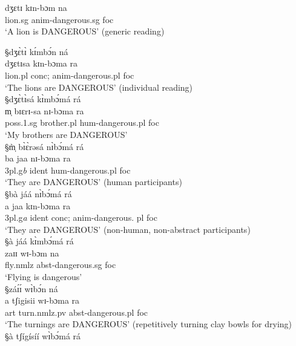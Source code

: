 \begin{exe}
  \ex\label{ex:agr1}
\begin{xlist}


\ex\label{ex:agrA}

\gll 
     {dʒɛtɪ} {kɪn}-{bɔm} {na} \\
	{lion.{\sc sg}} {\sc anim}-{dangerous.{\sc sg}} {\sc foc} \\
\glt  `A lion is DANGEROUS' (generic reading) 

 {\S dʒɛ̀tɪ̀ kɪ́mbɔ́n  ná}\\

\ex\label{ex:agrB}
\gll
      {dʒɛtɪsa} {kɪn}-{bɔma} {ra} \\
	{lion.{\sc pl}}  {\sc  conc; anim}-{dangerous.{\sc pl}} {\sc foc} \\
\glt  `The lions are DANGEROUS' (individual reading) \\
 {\S  dʒɛ̀tɪ̀sá kɪ̀mbɔ́má  rá} \\


\ex\label{ex:agrD}
\gll
{m̩} {bɪɛrɪ-sa} {nɪ}-{bɔma} {ra} \\
	{{\sc poss.1.sg}} {brother.{\sc pl}} {\sc hum}-{dangerous.{\sc pl}} {\sc
foc} \\
\glt  `My brothers are DANGEROUS' \\
 {\S  m̩̀ bɪ̀ɛ̀rəsá  nɪ̀bɔ́má  rá} \\

\ex\label{ex:agrE}
\gll
{ba} {jaa} {nɪ}-{bɔma} {ra} \\
	{{\sc  3pl.g}{\it b}} {\sc ident} {\sc hum}-{dangerous.{\sc pl}} {\sc
foc}  \\
\glt  `They are DANGEROUS' (human participants)  \\
{\S  bà  jáá  nɪ̀bɔ́má   rá} \\


\ex\label{ex:agrF}
\gll
{a} {jaa} {kɪn}-{bɔma} {ra} \\
	{{\sc  3pl.g}{\it a}} {\sc ident}  {\sc  conc; anim}-{dangerous.{\sc
pl}}
{\sc foc} \\
\glt  `They are DANGEROUS' (non-human, non-abstract participants) \\
 {\S  à   jáá   kɪ̀mbɔ́má  rá}\\


\ex\label{ex:agrG}
\gll 
{zaɪɪ} {wɪ}-{bɔm} {na} \\
	{fly.{\sc nmlz}} {\sc abst}-{dangerous.{\sc sg}} {\sc foc} \\
\glt  `Flying is dangerous'  \\
{\S záɪ́ɪ́   wɪ̀bɔ́n ná} \\



\ex\label{ex:agrH}
\gll
     {a} {tʃigisii} {wɪ}-{bɔma} {ra}    \\
	{\sc art} {turn.{\sc nmlz.pv}} {\sc abst}-{dangerous.{\sc pl}} {\sc foc}
\\
\glt  `The turnings  are DANGEROUS' (repetitively turning clay bowls for
drying) \\
 {\S  à tʃígísíí wɪ̀bɔ́má rá} 
\end{xlist}
\end{exe}

